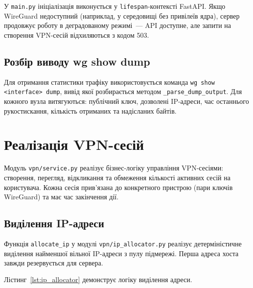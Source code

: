 У \texttt{main.py} ініціалізація виконується у \texttt{lifespan}-контексті
FastAPI. Якщо WireGuard недоступний (наприклад, у середовищі без привілеїв
ядра), сервер продовжує роботу в деградованому режимі~--- API доступне,
але запити на створення VPN-сесій відхиляються з кодом 503.

\subsection{Розбір виводу wg show dump}

Для отримання статистики трафіку використовується команда
\texttt{wg show <interface> dump}, вивід якої розбирається методом
\texttt{\_parse\_dump\_output}. Для кожного вузла витягуються:
публічний ключ, дозволені IP-адреси, час останнього рукостискання,
кількість отриманих та надісланих байтів.

\section{Реалізація VPN-сесій}
\label{sec:sessions_implementation}

Модуль \texttt{vpn/service.py} реалізує бізнес-логіку управління
VPN-сесіями: створення, перегляд, відкликання та обмеження кількості
активних сесій на користувача. Кожна сесія прив'язана до конкретного
пристрою (пари ключів WireGuard) та має час закінчення дії.

\subsection{Виділення IP-адреси}

Функція \texttt{allocate\_ip} у модулі \texttt{vpn/ip\_allocator.py}
реалізує детерміністичне виділення найменшої вільної IP-адреси з пулу
підмережі. Перша адреса хоста завжди резервується для сервера.

Лістинг~\ref{lst:ip_allocator} демонструє логіку виділення адреси.

